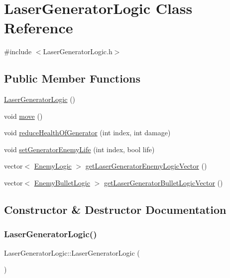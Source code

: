 \hypertarget{class_laser_generator_logic}{}\section{Laser\+Generator\+Logic Class Reference}
\label{class_laser_generator_logic}


{\ttfamily \#include $<$Laser\+Generator\+Logic.\+h$>$}

\subsection*{Public Member Functions}
\begin{DoxyCompactItemize}
\item 
\hyperlink{class_laser_generator_logic_a1e7385490236149a463731684f53d98c}{Laser\+Generator\+Logic} ()
\item 
void \hyperlink{class_laser_generator_logic_a0d1ff892a26f82064832b57f13501328}{move} ()
\item 
void \hyperlink{class_laser_generator_logic_abca36f94574eff33848b5b6c3d3ec909}{reduce\+Health\+Of\+Generator} (int index, int damage)
\item 
void \hyperlink{class_laser_generator_logic_a06cbb88e7126a023cb585ef873a2e094}{set\+Generator\+Enemy\+Life} (int index, bool life)
\item 
vector$<$ \hyperlink{class_enemy_logic}{Enemy\+Logic} $>$ \hyperlink{class_laser_generator_logic_a40fe8a8f8c58d916fb6f9fff4265c51a}{get\+Laser\+Generator\+Enemy\+Logic\+Vector} ()
\item 
vector$<$ \hyperlink{class_enemy_bullet_logic}{Enemy\+Bullet\+Logic} $>$ \hyperlink{class_laser_generator_logic_a0843c103357c87500b28bbca973f9512}{get\+Laser\+Generator\+Bullet\+Logic\+Vector} ()
\end{DoxyCompactItemize}


\subsection{Constructor \& Destructor Documentation}
\mbox{\label{class_laser_generator_logic_a1e7385490236149a463731684f53d98c}} 
\subsubsection{\texorpdfstring{Laser\+Generator\+Logic()}{LaserGeneratorLogic()}}
{\footnotesize\ttfamily Laser\+Generator\+Logic\+::\+Laser\+Generator\+Logic (\begin{DoxyParamCaption}{ }\end{DoxyParamCaption})}

